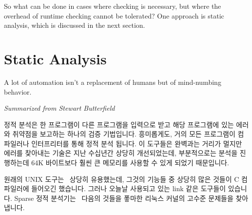 So what can be done in cases where checking is necessary, but where the
overhead of runtime checking cannot be tolerated?
One approach is static analysis, which is discussed in the next section.

\fi

\section{Static Analysis}
\label{sec:debugging:Static Analysis}
%
\epigraph{A lot of automation isn't a replacement of
	  humans but of mind-numbing behavior.}
	 {\emph{Summarized from Stewart Butterfield}}

정적 분석은 한 프로그램이 다른 프로그램을 입력으로 받고 해당 프로그램에 있는
에러와 취약점을 보고하는 하나의 검증 기법입니다.
흥미롭게도, 거의 모든 프로그램이 컴파일러나 인터프리터를 통해 정적 분석 됩니다.
이 도구들은 완벽과는 거리가 멀지만 에러를 찾아내는 기술은 지난 수십년간 상당히
개선되었는데, 부분적으로는 분석을 진행하는데 64K 바이트보다 훨씬 큰 메모리를
사용할 수 있게 되었기 때문입니다.

원래의 UNIX  도구는~\cite{StephenJohnson1977lint} 상당히 유용했는데,
그것의 기능들 중 상당히 많은 것들이 C 컴파일러에 들어오긴 했습니다.
그러나 오늘날 사용되고 있는 link 같은 도구들이 있습니다.
Sparse 정적 분석기는~\cite{JonathanCorbet2004sparse} 다음의 것들을 퐇마한
리눅스 커널의 고수준 문제들을 찾아냅니다.

